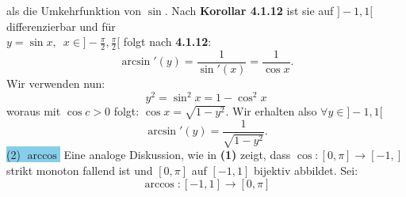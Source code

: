 \documentclass[landscape, 10pt]{article}
\begin{document}
\begin{multicols}{3}
                            als die Umkehrfunktion von
                            \textcolor{NavyBlue}{
                            $\sin$}. Nach 
                            \textbf{Korollar 4.1.12} 
                            ist sie auf \textcolor{NavyBlue}{$]-1,1[$ }
                            differenzierbar und für\\
                            \textcolor{NavyBlue}{
                            $y=\sin x,\enspace 
                            x\in]-\frac{\pi}{2},\frac{\pi}{2}[$}
                            folgt nach \textbf{4.1.12}:
                            \begin{equation*}
                                   \arcsin'(y)
                                   =\frac{1}{\sin'(x)}
                                   =\frac{1}{\cos x}.
                            \end{equation*}
                            Wir verwenden nun: 
                            \begin{equation*}
                                   y^2=\sin^2x=1-\cos^2x
                            \end{equation*}
                            woraus mit 
                            \textcolor{NavyBlue}{
                            $\cos c>0$} folgt:
                            \textcolor{NavyBlue}{
                            $\cos x=\sqrt{1-y^2}$}. 
                            Wir erhalten also 
                            \textcolor{NavyBlue}{
                            $\forall y\in ]-1,1[$}
                            \begin{equation*}
                                   \arcsin'(y)
                                   =\frac{1}{\sqrt{1-y^2}}.
                            \end{equation*}
                     \colorbox{SkyBlue}{(2) $\arccos$}
                            Eine analoge Diskussion, wie in 
                            \textbf{(1)} zeigt, dass
                            \textcolor{NavyBlue}{
                            $\cos:[0,\pi]\longrightarrow[-1,]$}
                            strikt monoton fallend ist
                            und 
                            \textcolor{NavyBlue}{
                            $[0,\pi]$} auf 
                            \textcolor{NavyBlue}{
                            $[-1,1]$}
                            bijektiv abbildet. Sei:
                            \begin{equation*}
                                  \arccos:[-1,1]
                                   \longrightarrow[0,\pi] 

\end{equation*}
\end{multicols}
\end{document}
